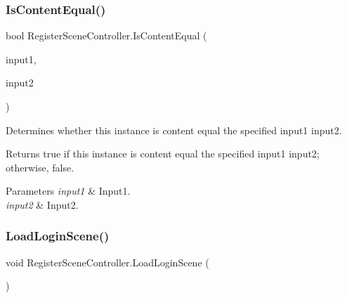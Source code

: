 \mbox{\label{classRegisterSceneController_a7f1d806aaa9a339363112fa8b4af05bd}} 
\subsubsection{\texorpdfstring{Is\+Content\+Equal()}{IsContentEqual()}}
{\footnotesize\ttfamily bool Register\+Scene\+Controller.\+Is\+Content\+Equal (\begin{DoxyParamCaption}\item[{Input\+Field}]{input1,  }\item[{Input\+Field}]{input2 }\end{DoxyParamCaption})\hspace{0.3cm}{\ttfamily [inline]}}



Determines whether this instance is content equal the specified input1 input2. 

\begin{DoxyReturn}{Returns}
{\ttfamily true} if this instance is content equal the specified input1 input2; otherwise, {\ttfamily false}.
\end{DoxyReturn}

\begin{DoxyParams}{Parameters}
{\em input1} & Input1.\\
\hline
{\em input2} & Input2.\\
\hline
\end{DoxyParams}
\mbox{\label{classRegisterSceneController_aacefa2b50cf97ef1b598341fdd03b5f5}} 
\subsubsection{\texorpdfstring{Load\+Login\+Scene()}{LoadLoginScene()}}
{\footnotesize\ttfamily void Register\+Scene\+Controller.\+Load\+Login\+Scene (\begin{DoxyParamCaption}{ }\end{DoxyParamCaption})\hspace{0.3cm}{\ttfamily [inline]}}

